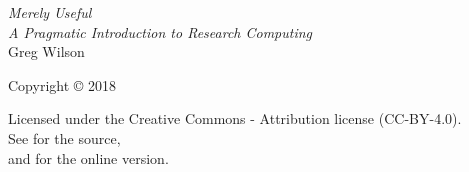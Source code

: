 \pagestyle{empty}

{\begingroup
  \raggedleft
  \vspace*{\baselineskip}


  {\Huge\itshape Merely Useful}\\[\baselineskip]

  {\large\itshape
    A Pragmatic Introduction to Research Computing
  }\\[0.2\textheight]

  {\large Greg Wilson}\par

  \vfill

  {\large Copyright {\copyright} 2018}

  \vspace*{\baselineskip}

  {\small
    Licensed under the Creative Commons - Attribution license (CC-BY-4.0).
    \\
    See {\repository} for the source,\\
    and {\website} for the online version.
  }

\endgroup}

\newpage

\pagestyle{empty}

~

\newpage

\tableofcontents

\newpage

\pagestyle{empty}

~

\newpage

\pagestyle{plain}
